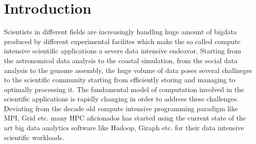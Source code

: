 \documentclass[conference]{IEEEtran}
\begin{document}


%
\IEEEpeerreviewmaketitle



\section {Introduction}
Scientists in different fields are increasingly handling huge amount of bigdata produced by different experimental facilites which make the so called compute intensive scientific applications a severe data intensive endeavor. 
Starting from the astronomical data analysis to the coastal simulation, from the social data analysis to the genome assembly, the huge volume of data poses several challneges to the scientific community starting from efficiently storing and managing to optimally processing it.
The fundamental model of computation involved in the scientific applications is rapidly changing in order to address these challenges.
Deviating from the decade old compute intensive programming paradigm like MPI, Grid etc. many HPC aficionados has started using the current state of the art big data analytics software like Hadoop, Giraph etc. for their data intensive scientific workloads.
\end{document}
